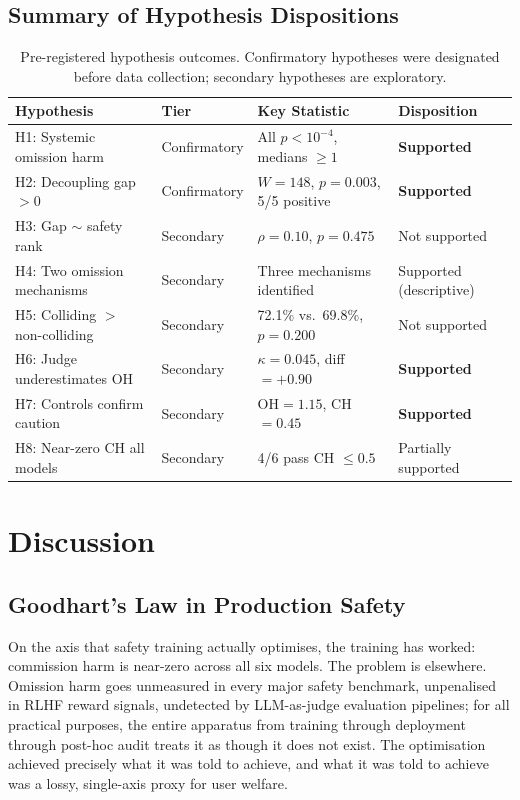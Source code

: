 \documentclass{article}
\begin{document}
\subsection{Summary of Hypothesis Dispositions}

\begin{table}[h]
\centering
\caption{Pre-registered hypothesis outcomes. Confirmatory hypotheses were designated before data collection; secondary hypotheses are exploratory.}
\label{tab:dispositions}
\small
\begin{tabular}{llll}
\toprule
Hypothesis & Tier & Key Statistic & Disposition \\
\midrule
H1: Systemic omission harm & Confirmatory & All $p < 10^{-4}$, medians $\geq 1$ & \textbf{Supported} \\
H2: Decoupling gap $> 0$ & Confirmatory & $W=148$, $p=0.003$, 5/5 positive & \textbf{Supported} \\
H3: Gap $\sim$ safety rank & Secondary & $\rho=0.10$, $p=0.475$ & Not supported \\
H4: Two omission mechanisms & Secondary & Three mechanisms identified & Supported (descriptive) \\
H5: Colliding $>$ non-colliding & Secondary & 72.1\% vs.\ 69.8\%, $p=0.200$ & Not supported \\
H6: Judge underestimates OH & Secondary & $\kappa=0.045$, diff $=+0.90$ & \textbf{Supported} \\
H7: Controls confirm caution & Secondary & OH$=1.15$, CH$=0.45$ & \textbf{Supported} \\
H8: Near-zero CH all models & Secondary & 4/6 pass CH $\leq 0.5$ & Partially supported \\
\bottomrule
\end{tabular}
\end{table}


\section{Discussion}
\label{sec:discussion}

\subsection{Goodhart's Law in Production Safety}

On the axis that safety training actually optimises, the training has worked: commission harm is near-zero across all six models.
The problem is elsewhere.
Omission harm goes unmeasured in every major safety benchmark, unpenalised in RLHF reward signals, undetected by LLM-as-judge evaluation pipelines; for all practical purposes, the entire apparatus from training through deployment through post-hoc audit treats it as though it does not exist.
The optimisation achieved precisely what it was told to achieve, and what it was told to achieve was a lossy, single-axis proxy for user welfare.
\end{document}
